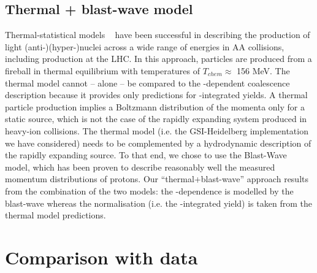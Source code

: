 \documentclass{appolb}
\begin{document}
\subsection{Thermal + blast-wave model} 
Thermal-statistical models ~\cite{Andronic:2010qu, Andronic:2017} have been successful in describing the production of light \mbox{(anti-)}(hyper-)nuclei across a wide range of energies in AA collisions, including production at the LHC.
In this approach, particles are produced from a fireball in thermal equilibrium with temperatures of $T_{chem} \approx$ 156 MeV.
The thermal model cannot -- alone -- be compared to the \pt-dependent coalescence description because it provides only predictions for \pt-integrated yields. 
A thermal particle production implies a Boltzmann distribution of the momenta only for a static source, which is not the case of the rapidly expanding system produced in heavy-ion collisions. 
The thermal model (i.e. the GSI-Heidelberg implementation we have considered) needs to be complemented by a
hydrodynamic description of the rapidly expanding source. 
To that end, we chose to use the Blast-Wave model, which has been proven to describe reasonably well the measured momentum distributions of protons. 
Our ``thermal+blast-wave'' approach results from the combination of the two models: the \pt-dependence is modelled by the blast-wave whereas the normalisation (i.e. the \pt-integrated yield) is taken from the thermal model predictions.

\section{Comparison with data} \label{sec:results}
\end{document}
